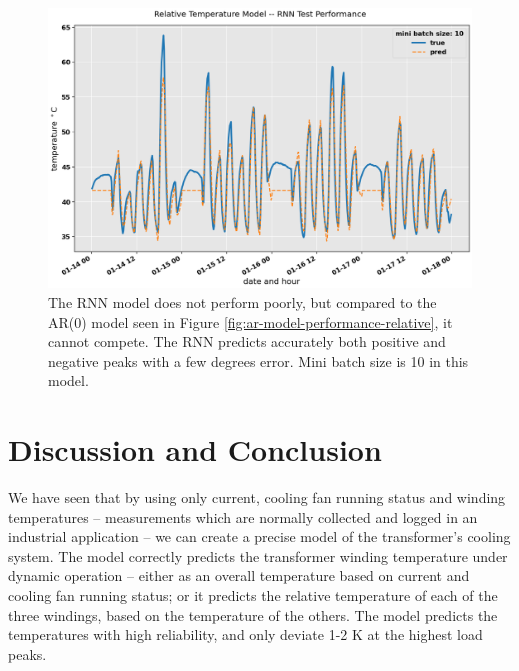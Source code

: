 \documentclass[]{article}
\begin{document}
\begin{figure}[!h]
	\centering
	\includegraphics[width=1\linewidth]{./figs/rnn-model-performance-relative.png}
	\caption{The RNN model does not perform poorly, but compared to the AR(0) model seen in Figure \ref{fig:ar-model-performance-relative}, it cannot compete. The RNN predicts accurately both positive and negative peaks with a few degrees error. Mini batch size is 10 in this model.}
	\label{fig:rnn-model-performance-relative}
\end{figure}

\clearpage
\section{Discussion and Conclusion} \label{sec:conclusion}

We have seen that by using only current, cooling fan running status and winding temperatures -- measurements which are normally collected and logged in an industrial application -- we can create a precise model of the transformer's cooling system. The model correctly predicts the transformer winding temperature under dynamic operation -- either as an overall temperature based on current and cooling fan running status; or it predicts the relative temperature of each of the three windings, based on the temperature of the others. The model predicts the temperatures with high reliability, and only deviate 1-2 K at the highest load peaks.
\end{document}
